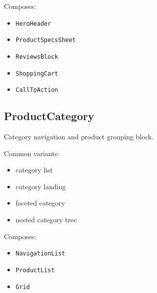 Composes:

\begin{itemize}
\tightlist
\item
  \texttt{H\allowbreak{}e\allowbreak{}r\allowbreak{}o\allowbreak{}H\allowbreak{}e\allowbreak{}a\allowbreak{}d\allowbreak{}e\allowbreak{}r}
\item
  \texttt{P\allowbreak{}r\allowbreak{}o\allowbreak{}d\allowbreak{}u\allowbreak{}c\allowbreak{}t\allowbreak{}S\allowbreak{}p\allowbreak{}e\allowbreak{}c\allowbreak{}s\allowbreak{}S\allowbreak{}h\allowbreak{}e\allowbreak{}e\allowbreak{}t}
\item
  \texttt{R\allowbreak{}e\allowbreak{}v\allowbreak{}i\allowbreak{}e\allowbreak{}w\allowbreak{}s\allowbreak{}B\allowbreak{}l\allowbreak{}o\allowbreak{}c\allowbreak{}k}
\item
  \texttt{S\allowbreak{}h\allowbreak{}o\allowbreak{}p\allowbreak{}p\allowbreak{}i\allowbreak{}n\allowbreak{}g\allowbreak{}C\allowbreak{}a\allowbreak{}r\allowbreak{}t}
\item
  \texttt{C\allowbreak{}a\allowbreak{}l\allowbreak{}l\allowbreak{}T\allowbreak{}o\allowbreak{}A\allowbreak{}c\allowbreak{}t\allowbreak{}i\allowbreak{}o\allowbreak{}n}
\end{itemize}

\subsection{ProductCategory}\label{record-128-productcategory}

Category navigation and product grouping block.

Common variants:

\begin{itemize}
\tightlist
\item
  category list
\item
  category landing
\item
  faceted category
\item
  nested category tree
\end{itemize}

Composes:

\begin{itemize}
\tightlist
\item
  \texttt{N\allowbreak{}a\allowbreak{}v\allowbreak{}i\allowbreak{}g\allowbreak{}a\allowbreak{}t\allowbreak{}i\allowbreak{}o\allowbreak{}n\allowbreak{}L\allowbreak{}i\allowbreak{}s\allowbreak{}t}
\item
  \texttt{P\allowbreak{}r\allowbreak{}o\allowbreak{}d\allowbreak{}u\allowbreak{}c\allowbreak{}t\allowbreak{}L\allowbreak{}i\allowbreak{}s\allowbreak{}t}
\item
  \texttt{G\allowbreak{}r\allowbreak{}i\allowbreak{}d}
\end{itemize}

